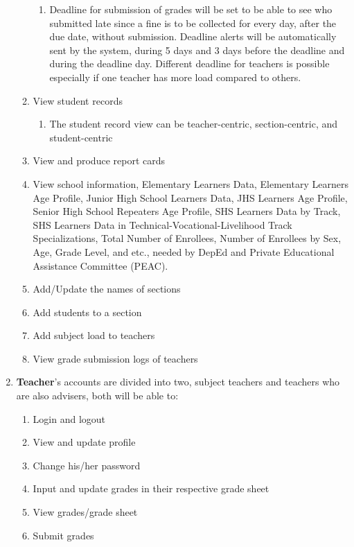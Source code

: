 \documentclass[11pt,a4paper,titlepage]{article}
\begin{document}
\begin{enumerate}
\begin{enumerate}
        \begin{enumerate}
            \item Deadline for submission of grades will be set to be able to see who submitted late since a fine is to be collected for every day, after the due date, without submission. Deadline alerts will be automatically sent by the system, during 5 days and 3 days before the deadline and during the deadline day. Different deadline for teachers is possible especially if one teacher has more load compared to others.
        \end{enumerate}
        \item View student records
        \begin{enumerate}
            \item The student record view can be teacher-centric, section-centric, and student-centric
        \end{enumerate}
        \item View and produce report cards
        \item View school information, Elementary Learners Data, Elementary Learners Age Profile, Junior High School Learners Data, JHS Learners Age Profile, Senior High School Repeaters Age Profile, SHS Learners Data by Track, SHS Learners Data in Technical-Vocational-Livelihood Track Specializations, Total Number of Enrollees, Number of Enrollees by Sex, Age, Grade Level, and etc., needed by DepEd and Private Educational Assistance Committee (PEAC).
        \item Add/Update the names of sections
        \item Add students to a section
        \item Add subject load to teachers
        \item View grade submission logs of teachers
    \end{enumerate}
    \item \textbf{Teacher}'s accounts are divided into two, subject teachers and teachers who are also advisers, both will be able to: 
    \begin{enumerate}
        \item Login and logout
        \item View and update profile
        \item Change his/her password
        \item Input and update grades in their respective grade sheet
        \item View grades/grade sheet
        \item Submit grades
    \end{enumerate}


\end{enumerate}
\end{document}
